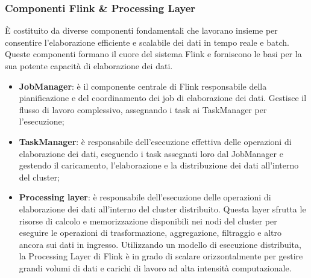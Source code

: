 \subsubsection{Componenti Flink \& Processing Layer}
È costituito da diverse componenti fondamentali che lavorano insieme per consentire l'elaborazione efficiente e scalabile dei dati in tempo reale e batch. Queste componenti formano il cuore del sistema Flink e forniscono le basi per la sua potente capacità di elaborazione dei dati.
\begin{itemize}
	\item \textbf{JobManager}: è il componente centrale di Flink responsabile della pianificazione e del coordinamento dei job di elaborazione dei dati. Gestisce il flusso di lavoro complessivo, assegnando i task ai TaskManager per l'esecuzione;
	\item \textbf{TaskManager}: è responsabile dell'esecuzione effettiva delle operazioni di elaborazione dei dati, eseguendo i task assegnati loro dal JobManager e gestendo il caricamento, l'elaborazione e la distribuzione dei dati all'interno del cluster;
	\item \textbf{Processing layer}: è responsabile dell'esecuzione delle operazioni di elaborazione dei dati all'interno del cluster distribuito. Questa layer sfrutta le risorse di calcolo e memorizzazione disponibili nei nodi del cluster per eseguire le operazioni di trasformazione, aggregazione, filtraggio e altro ancora sui dati in ingresso. Utilizzando un modello di esecuzione distribuita, la Processing Layer di Flink è in grado di scalare orizzontalmente per gestire grandi volumi di dati e carichi di lavoro ad alta intensità computazionale.
\end{itemize}
